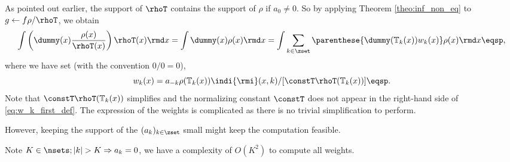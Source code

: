  
 
  
 
As pointed out earlier, the support of $\rhoT$ contains the support of $\rho$ if $a_0 \neq 0$. So by applying Theorem \ref{theo:inf_non_eq} to $g \leftarrow f \rho /\rhoT$, we obtain 
\begin{equation}
\label{eq:key-relation}
\int \left(\dummy(x) \frac{\rho(x)}{\rhoT(x)}\right) \rhoT(x)  \rmd x =
\int \dummy(x) \rho(x)  \rmd x
=\int \sum_{k\in \zset}  \parenthese{\dummy(\mathbb{T}_{k}(x)) w_k(x)} \rho(x)  \rmd x \eqsp,
\end{equation}
where we have set (with the convention $0/0=0$), 
\begin{equation}
\label{eq:w_k_first_def}
w_k(x) = a_{-k}  \rho(\mathbb{T}_{k}(x))\indi{\rmi}(x,k) / [\constT\rhoT(\mathbb{T}_{k}(x))]  \eqsp.
\end{equation}
Note that $\constT\rhoT(\mathbb{T}_{k}(x))$ simplifies and the
normalizing constant $\constT$ does not appear in the right-hand
side of \eqref{eq:w_k_first_def}. The expression of the weights is complicated as there is no trivial simplification to perform.

However, keeping the support of the $(a_k)_{k\in\zset}$ small might keep the computation feasible. 

Note $K\in\nsets; |k|>K \Rightarrow a_k = 0$, we have a complexity of $O(K^2)$ to compute all weights.
